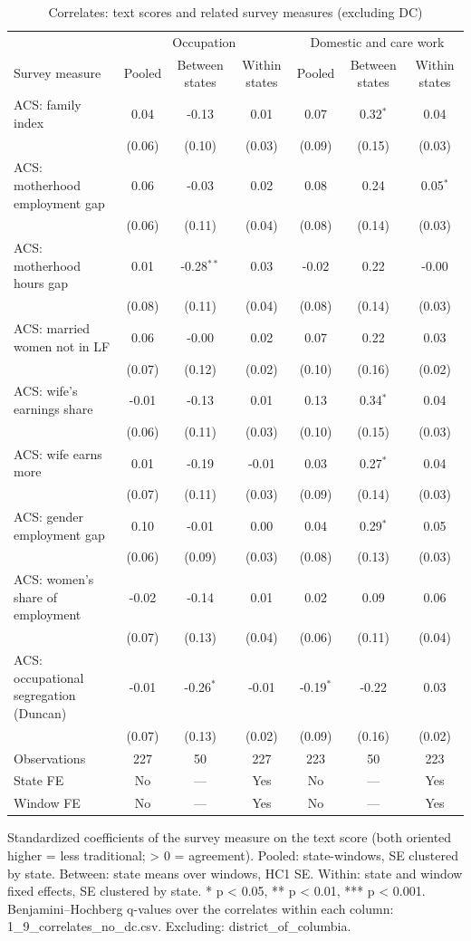 \begin{table}[ht]\centering\small
\caption{Correlates: text scores and related survey measures (excluding DC)}
\begin{tabular}{lcccccc}
\toprule
 & \multicolumn{3}{c}{Occupation} & \multicolumn{3}{c}{Domestic and care work} \\
Survey measure & Pooled & Between states & Within states & Pooled & Between states & Within states \\
\midrule
ACS: family index & 0.04 & -0.13 & 0.01 & 0.07 & 0.32$^{*}$ & 0.04 \\
 & (0.06) & (0.10) & (0.03) & (0.09) & (0.15) & (0.03) \\
ACS: motherhood employment gap & 0.06 & -0.03 & 0.02 & 0.08 & 0.24 & 0.05$^{*}$ \\
 & (0.06) & (0.11) & (0.04) & (0.08) & (0.14) & (0.03) \\
ACS: motherhood hours gap & 0.01 & -0.28$^{**}$ & 0.03 & -0.02 & 0.22 & -0.00 \\
 & (0.08) & (0.11) & (0.04) & (0.08) & (0.14) & (0.03) \\
ACS: married women not in LF & 0.06 & -0.00 & 0.02 & 0.07 & 0.22 & 0.03 \\
 & (0.07) & (0.12) & (0.02) & (0.10) & (0.16) & (0.02) \\
ACS: wife's earnings share & -0.01 & -0.13 & 0.01 & 0.13 & 0.34$^{*}$ & 0.04 \\
 & (0.06) & (0.11) & (0.03) & (0.10) & (0.15) & (0.03) \\
ACS: wife earns more & 0.01 & -0.19 & -0.01 & 0.03 & 0.27$^{*}$ & 0.04 \\
 & (0.07) & (0.11) & (0.03) & (0.09) & (0.14) & (0.03) \\
ACS: gender employment gap & 0.10 & -0.01 & 0.00 & 0.04 & 0.29$^{*}$ & 0.05 \\
 & (0.06) & (0.09) & (0.03) & (0.08) & (0.13) & (0.03) \\
ACS: women's share of employment & -0.02 & -0.14 & 0.01 & 0.02 & 0.09 & 0.06 \\
 & (0.07) & (0.13) & (0.04) & (0.06) & (0.11) & (0.04) \\
ACS: occupational segregation (Duncan) & -0.01 & -0.26$^{*}$ & -0.01 & -0.19$^{*}$ & -0.22 & 0.03 \\
 & (0.07) & (0.13) & (0.02) & (0.09) & (0.16) & (0.02) \\
\midrule
Observations & 227 & 50 & 227 & 223 & 50 & 223 \\
State FE & No & — & Yes & No & — & Yes \\
Window FE & No & — & Yes & No & — & Yes \\
\bottomrule
\end{tabular}
\par\footnotesize Standardized coefficients of the survey measure on the text score (both oriented higher = less traditional; > 0 = agreement). Pooled: state-windows, SE clustered by state. Between: state means over windows, HC1 SE. Within: state and window fixed effects, SE clustered by state. * p < 0.05, ** p < 0.01, *** p < 0.001. Benjamini–Hochberg q-values over the correlates within each column: 1_9_correlates_no_dc.csv. Excluding: district_of_columbia.
\end{table}
